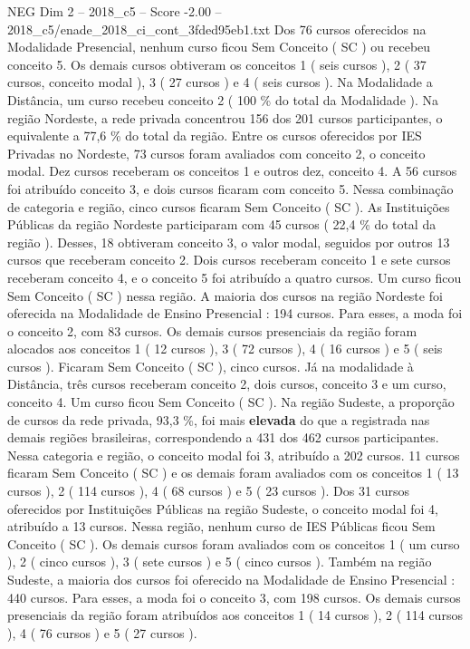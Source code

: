 \begin{textsample}{NEG Dim 2 – 2018\_c5 – Score -2.00 – 2018\_c5/enade\_2018\_ci\_cont\_3fded95eb1.txt}
Dos 76 cursos oferecidos na Modalidade Presencial, nenhum curso ficou Sem Conceito ( SC ) ou recebeu conceito 5.
Os demais cursos obtiveram os conceitos 1 ( seis cursos ), 2 ( 37 cursos, conceito modal ), 3 ( 27 cursos ) e 4 ( seis cursos ).
Na Modalidade a Distância, um curso recebeu conceito 2 ( 100 \% do total da Modalidade ).
Na região Nordeste, a rede privada concentrou 156 dos 201 cursos participantes, o equivalente a 77,6 \% do total da região.
Entre os cursos oferecidos por IES Privadas no Nordeste, 73 cursos foram avaliados com conceito 2, o conceito modal.
Dez cursos receberam os conceitos 1 e outros dez, conceito 4.
A 56 cursos foi atribuído conceito 3, e dois cursos ficaram com conceito 5.
Nessa combinação de categoria e região, cinco cursos ficaram Sem Conceito ( SC ).
As Instituições Públicas da região Nordeste participaram com 45 cursos ( 22,4 \% do total da região ).
Desses, 18 obtiveram conceito 3, o valor modal, seguidos por outros 13 cursos que receberam conceito 2.
Dois cursos receberam conceito 1 e sete cursos receberam conceito 4, e o conceito 5 foi atribuído a quatro cursos.
Um curso ficou Sem Conceito ( SC ) nessa região.
A maioria dos cursos na região Nordeste foi oferecida na Modalidade de Ensino Presencial : 194 cursos.
Para esses, a moda foi o conceito 2, com 83 cursos.
Os demais cursos presenciais da região foram alocados aos conceitos 1 ( 12 cursos ), 3 ( 72 cursos ), 4 ( 16 cursos ) e 5 ( seis cursos ).
Ficaram Sem Conceito ( SC ), cinco cursos.
Já na modalidade à Distância, três cursos receberam conceito 2, dois cursos, conceito 3 e um curso, conceito 4.
Um curso ficou Sem Conceito ( SC ).
Na região Sudeste, a proporção de cursos da rede privada, 93,3 \%, foi mais \textbf{elevada} do que a registrada nas demais regiões brasileiras, correspondendo a 431 dos 462 cursos participantes.
Nessa categoria e região, o conceito modal foi 3, atribuído a 202 cursos. 11 cursos ficaram Sem Conceito ( SC ) e os demais foram avaliados com os conceitos 1 ( 13 cursos ), 2 ( 114 cursos ), 4 ( 68 cursos ) e 5 ( 23 cursos ).
Dos 31 cursos oferecidos por Instituições Públicas na região Sudeste, o conceito modal foi 4, atribuído a 13 cursos.
Nessa região, nenhum curso de IES Públicas ficou Sem Conceito ( SC ).
Os demais cursos foram avaliados com os conceitos 1 ( um curso ), 2 ( cinco cursos ), 3 ( sete cursos ) e 5 ( cinco cursos ).
Também na região Sudeste, a maioria dos cursos foi oferecido na Modalidade de Ensino Presencial : 440 cursos.
Para esses, a moda foi o conceito 3, com 198 cursos.
Os demais cursos presenciais da região foram atribuídos aos conceitos 1 ( 14 cursos ), 2 ( 114 cursos ), 4 ( 76 cursos ) e 5 ( 27 cursos ).

\end{textsample}

